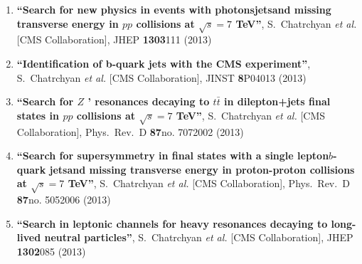 \begin{enumerate}
\item%
{\bf ``Search for new physics in events with photonsjetsand missing transverse energy in $pp$ collisions at $\sqrt{s}=7$ TeV''}, 
  S.~Chatrchyan {\it et al.}  [CMS Collaboration], 
JHEP {\bf 1303}111 (2013) %


\item%
{\bf ``Identification of b-quark jets with the CMS experiment''}, 
  S.~Chatrchyan {\it et al.}  [CMS Collaboration], 
JINST {\bf 8}P04013 (2013) %


\item%
{\bf ``Search for $Z$ ' resonances decaying to $t\bar{t}$ in dilepton+jets final states in $pp$ collisions at $\sqrt{s}=7$ TeV''}, 
  S.~Chatrchyan {\it et al.}  [CMS Collaboration], 
Phys.\ Rev.\ D {\bf 87}no. 7072002 (2013) %


\item%
{\bf ``Search for supersymmetry in final states with a single lepton$b$-quark jetsand missing transverse energy in proton-proton collisions at $\sqrt{s}=7$ TeV''}, 
  S.~Chatrchyan {\it et al.}  [CMS Collaboration], 
Phys.\ Rev.\ D {\bf 87}no. 5052006 (2013) %


\item%
{\bf ``Search in leptonic channels for heavy resonances decaying to long-lived neutral particles''}, 
  S.~Chatrchyan {\it et al.}  [CMS Collaboration], 
JHEP {\bf 1302}085 (2013) %



\end{enumerate}
